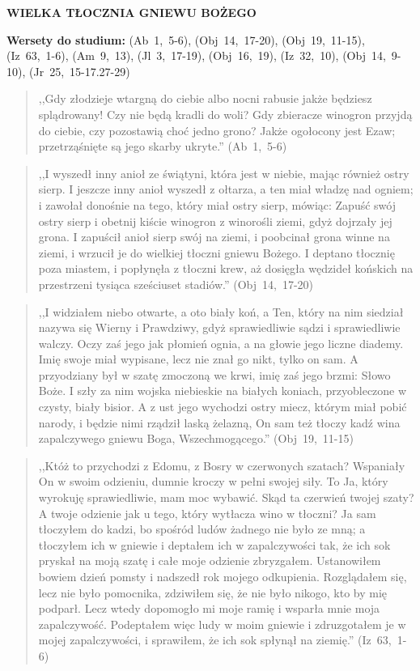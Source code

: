 \documentclass[10pt,a4paper,oneside]{article}
\begin{document}
\centerline{\textbf{\MakeUppercase{Wielka tłocznia gniewu Bożego}}}
\begin{center}
\textbf{Wersety do studium:} \mbox{(Ab 1, 5-6)}, \mbox{(Obj 14, 17-20)}, \mbox{(Obj 19, 11-15)}, \mbox{(Iz 63, 1-6)}, \mbox{(Am 9, 13)}, \mbox{(Jl 3, 17-19)}, \mbox{(Obj 16, 19)}, \mbox{(Iz 32, 10)}, \mbox{(Obj 14, 9-10)}, \mbox{(Jr 25, 15-17.27-29)}
\end{center}
\begin{quote}
,,Gdy złodzieje wtargną do ciebie albo nocni rabusie jakże będziesz splądrowany! Czy nie będą kradli do woli? Gdy zbieracze winogron przyjdą do ciebie, czy pozostawią choć jedno grono? Jakże ogołocony jest Ezaw; przetrząśnięte są jego skarby ukryte.'' \mbox{(Ab 1, 5-6)}
\end{quote}
\begin{quote}
,,I wyszedł inny anioł ze świątyni, która jest w niebie, mając również ostry sierp. I jeszcze inny anioł wyszedł z ołtarza, a ten miał władzę nad ogniem; i zawołał donośnie na tego, który miał ostry sierp, mówiąc: Zapuść swój ostry sierp i obetnij kiście winogron z winorośli ziemi, gdyż dojrzały jej grona. I zapuścił anioł sierp swój na ziemi, i poobcinał grona winne na ziemi, i wrzucił je do wielkiej tłoczni gniewu Bożego. I deptano tłocznię poza miastem, i popłynęła z tłoczni krew, aż dosięgła wędzideł końskich na przestrzeni tysiąca sześciuset stadiów.'' \mbox{(Obj 14, 17-20)}
\end{quote}
\begin{quote}
,,I widziałem niebo otwarte, a oto biały koń, a Ten, który na nim siedział nazywa się Wierny i Prawdziwy, gdyż sprawiedliwie sądzi i sprawiedliwie walczy. Oczy zaś jego jak płomień ognia, a na głowie jego liczne diademy. Imię swoje miał wypisane, lecz nie znał go nikt, tylko on sam. A przyodziany był w szatę zmoczoną we krwi, imię zaś jego brzmi: Słowo Boże. I szły za nim wojska niebieskie na białych koniach, przyobleczone w czysty, biały bisior. A z ust jego wychodzi ostry miecz, którym miał pobić narody, i będzie nimi rządził laską żelazną, On sam też tłoczy kadź wina zapalczywego gniewu Boga, Wszechmogącego.'' \mbox{(Obj 19, 11-15)}
\end{quote}
\begin{quote}
,,Któż to przychodzi z Edomu, z Bosry w czerwonych szatach? Wspaniały On w swoim odzieniu, dumnie kroczy w pełni swojej siły. To Ja, który wyrokuję sprawiedliwie, mam moc wybawić. Skąd ta czerwień twojej szaty? A twoje odzienie jak u tego, który wytłacza wino w tłoczni? Ja sam tłoczyłem do kadzi, bo spośród ludów żadnego nie było ze mną; a tłoczyłem ich w gniewie i deptałem ich w zapalczywości tak, że ich sok pryskał na moją szatę i całe moje odzienie zbryzgałem. Ustanowiłem bowiem dzień pomsty i nadszedł rok mojego odkupienia. Rozglądałem się, lecz nie było pomocnika, zdziwiłem się, że nie było nikogo, kto by mię podparł. Lecz wtedy dopomogło mi moje ramię i wsparła mnie moja zapalczywość. Podeptałem więc ludy w moim gniewie i zdruzgotałem je w mojej zapalczywości, i sprawiłem, że ich sok spłynął na ziemię.'' \mbox{(Iz 63, 1-6)}
\end{quote}
\end{document}
